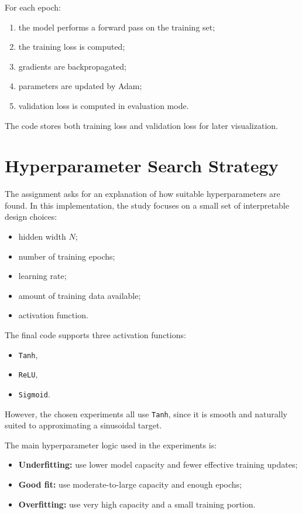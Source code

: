 \documentclass[11pt]{article}
\begin{document}
For each epoch:
\begin{enumerate}
    \item the model performs a forward pass on the training set;
    \item the training loss is computed;
    \item gradients are backpropagated;
    \item parameters are updated by Adam;
    \item validation loss is computed in evaluation mode.
\end{enumerate}

The code stores both training loss and validation loss for later visualization.

\section{Hyperparameter Search Strategy}

The assignment asks for an explanation of how suitable hyperparameters are found. In this implementation, the study focuses on a small set of interpretable design choices:

\begin{itemize}
    \item hidden width $N$;
    \item number of training epochs;
    \item learning rate;
    \item amount of training data available;
    \item activation function.
\end{itemize}

The final code supports three activation functions:
\begin{itemize}
    \item \texttt{Tanh},
    \item \texttt{ReLU},
    \item \texttt{Sigmoid}.
\end{itemize}

However, the chosen experiments all use \texttt{Tanh}, since it is smooth and naturally suited to approximating a sinusoidal target.

The main hyperparameter logic used in the experiments is:
\begin{itemize}
    \item \textbf{Underfitting:} use lower model capacity and fewer effective training updates;
    \item \textbf{Good fit:} use moderate-to-large capacity and enough epochs;
    \item \textbf{Overfitting:} use very high capacity and a small training portion.
\end{itemize}
\end{document}
